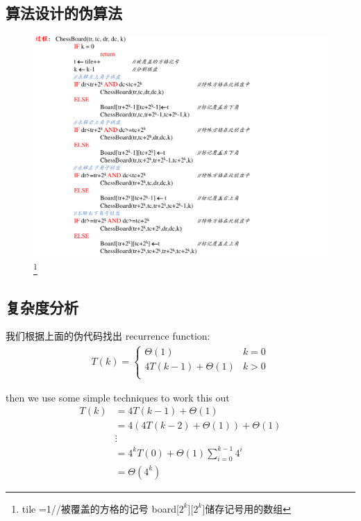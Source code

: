 \documentclass[a4paper, 10pt]{ctexart} %
\begin{document}
\subsection{算法设计的伪算法}
\begin{figure}[H]
    \centering
    \includegraphics*[scale = 0.5]{9.png}\footnote{ {\sffamily tile =1//被覆盖的方格的记号 }{\sffamily board[$2^k$][$2^k$]储存记号用的数组}}\caption{}
\end{figure}
\subsection{复杂度分析}
我们根据上面的伪代码找出 recurrence function: 
\begin{align*}
    T \left(k\right) = 
    \begin{cases}
        \Theta \left(1\right)    & k =  0 \\ 
        4 T \left( k- 1\right)  + \Theta \left(1\right) & k > 0\\
    \end{cases}
\end{align*}

then we use some simple techniques to work this out 
\begin{align*}
    T \left(k\right) & =  4 T\left( k -1\right)  + \Theta (1) \\ 
    & = 4 \left( 4 T\left( k -2\right) + \Theta \left(1\right) \right) + \Theta \left(1\right) \\
    & \vdots\\
    & =  4 ^{k } T \left(0\right) + \Theta \left(1\right) \sum_{  i= 0}  ^{k - 1} 4 ^{i}\\
    & = \Theta \left(4 ^{k}\right) 
\end{align*}
\end{document}
